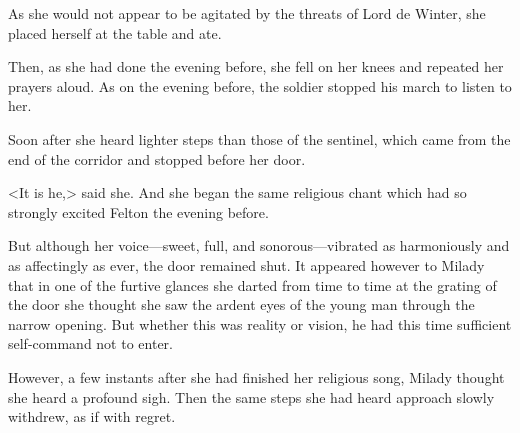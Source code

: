 As she would not appear to be agitated by the threats of Lord de Winter, she placed herself at the table and ate. 

Then, as she had done the evening before, she fell on her knees and repeated her prayers aloud. As on the evening before, the soldier stopped his march to listen to her. 

Soon after she heard lighter steps than those of the sentinel, which came from the end of the corridor and stopped before her door. 

<It is he,> said she. And she began the same religious chant which had so strongly excited Felton the evening before. 

But although her voice—sweet, full, and sonorous—vibrated as harmoniously and as affectingly as ever, the door remained shut. It appeared however to Milady that in one of the furtive glances she darted from time to time at the grating of the door she thought she saw the ardent eyes of the young man through the narrow opening. But whether this was reality or vision, he had this time sufficient self-command not to enter. 

However, a few instants after she had finished her religious song, Milady thought she heard a profound sigh. Then the same steps she had heard approach slowly withdrew, as if with regret. 